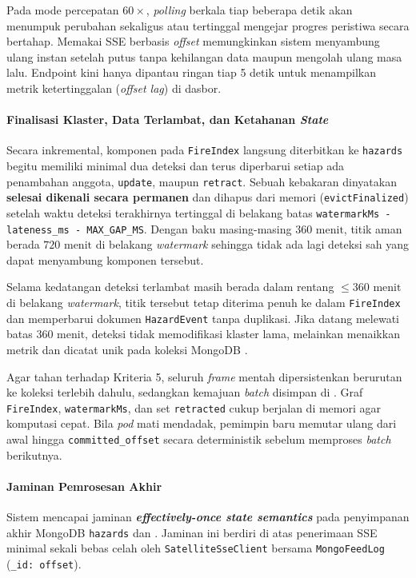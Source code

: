 Pada mode percepatan $60\times$, \textit{polling} berkala tiap beberapa detik akan menumpuk perubahan sekaligus atau tertinggal mengejar progres peristiwa secara bertahap. Memakai SSE berbasis \textit{offset} memungkinkan sistem menyambung ulang instan setelah putus tanpa kehilangan data maupun mengolah ulang masa lalu. Endpoint  kini hanya dipantau ringan tiap 5 detik untuk menampilkan metrik ketertinggalan (\textit{offset lag}) di dasbor.

\paragraph*{Finalisasi Klaster, Data Terlambat, dan Ketahanan \textit{State}}
Secara inkremental, komponen pada \texttt{FireIndex} langsung diterbitkan ke \texttt{hazards} begitu memiliki minimal dua deteksi dan terus diperbarui setiap ada penambahan anggota, \texttt{update}, maupun \texttt{retract}. Sebuah kebakaran dinyatakan \textbf{selesai dikenali secara permanen} dan dihapus dari memori (\texttt{evictFinalized}) setelah waktu deteksi terakhirnya tertinggal di belakang batas \texttt{watermarkMs - lateness\_ms - MAX\_GAP\_MS}. Dengan baku masing-masing $360\text{ menit}$, titik aman berada $720\text{ menit}$ di belakang \textit{watermark} sehingga tidak ada lagi deteksi sah yang dapat menyambung komponen tersebut.

Selama kedatangan deteksi terlambat masih berada dalam rentang $\le 360\text{ menit}$ di belakang \textit{watermark}, titik tersebut tetap diterima penuh ke dalam \texttt{FireIndex} dan memperbarui dokumen \texttt{HazardEvent} tanpa duplikasi. Jika datang melewati batas $360\text{ menit}$, deteksi tidak memodifikasi klaster lama, melainkan menaikkan metrik  dan dicatat unik pada koleksi MongoDB .

Agar tahan terhadap Kriteria 5, seluruh \textit{frame} mentah dipersistenkan berurutan ke koleksi  terlebih dahulu, sedangkan kemajuan \textit{batch} disimpan di . Graf \texttt{FireIndex}, \texttt{watermarkMs}, dan set \texttt{retracted} cukup berjalan di memori agar komputasi cepat. Bila \textit{pod} mati mendadak, pemimpin baru memutar ulang  dari awal hingga \texttt{committed\_offset} secara deterministik sebelum memproses \textit{batch} berikutnya.

\paragraph*{Jaminan Pemrosesan Akhir}
Sistem mencapai jaminan \textbf{\textit{effectively-once state semantics}} pada penyimpanan akhir MongoDB \texttt{hazards} dan . Jaminan ini berdiri di atas penerimaan SSE minimal sekali bebas celah oleh \texttt{SatelliteSseClient} bersama \texttt{MongoFeedLog} (\texttt{\_id: offset}).

